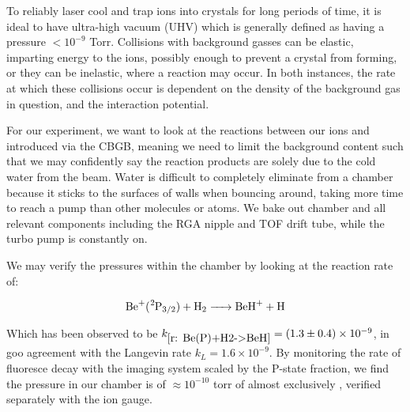 To reliably laser cool and trap ions into crystals for long periods of time, it is ideal to have ultra-high vacuum (UHV) which is generally defined as having a pressure $<10^{-9}$ Torr. Collisions with background gasses can be elastic, imparting energy to the ions, possibly enough to prevent a crystal from forming, or they can be inelastic, where a reaction may occur. In both instances, the rate at which these collisions occur is dependent on the density of the background gas in question, and the interaction potential.

For our experiment, we want to look at the reactions between our ions and  introduced via the CBGB, meaning we need to limit the background  content such that we may confidently say the reaction products are solely due to the cold water from the beam. Water is difficult to completely eliminate from a chamber because it sticks to the surfaces of walls when bouncing around, taking more time to reach a pump than other molecules or atoms. We bake out chamber and all relevant components including the RGA nipple and TOF drift tube, while the turbo pump is constantly on.

We may verify the pressures within the chamber by looking at the reaction rate of:

\begin{equation}
	\ce{Be+(^2P3/2) + H2 -> BeH+ + H}
	\label{r: Be(P)+H2->BeH}
\end{equation}

Which has been observed to be $k_{\ref{r: Be(P)+H2->BeH}} = (1.3 \pm 0.4)\times 10^{-9}$, in goo agreement with the Langevin rate $k_L=1.6 \times 10^{-9}$.\cite{Roth2006} By monitoring the rate of fluoresce decay with the imaging system scaled by the P-state fraction, we find the pressure in our chamber is of $\approx 10^{-10}$ torr of almost exclusively , verified separately with the ion gauge.

